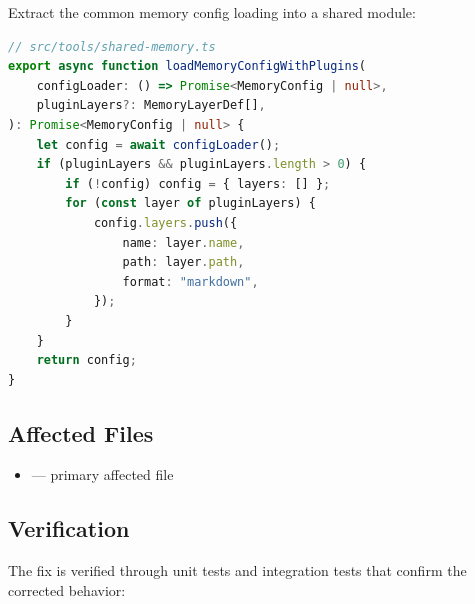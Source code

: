 Extract the common memory config loading into a shared module:



\begin{lstlisting}[language=TypeScript]
// src/tools/shared-memory.ts
export async function loadMemoryConfigWithPlugins(
    configLoader: () => Promise<MemoryConfig | null>,
    pluginLayers?: MemoryLayerDef[],
): Promise<MemoryConfig | null> {
    let config = await configLoader();
    if (pluginLayers && pluginLayers.length > 0) {
        if (!config) config = { layers: [] };
        for (const layer of pluginLayers) {
            config.layers.push({
                name: layer.name,
                path: layer.path,
                format: "markdown",
            });
        }
    }
    return config;
}

\end{lstlisting}




\subsection*{Affected Files}
\begin{itemize}
    \item {} — primary affected file
\end{itemize}

\subsection*{Verification}
The fix is verified through unit tests and integration tests that confirm the corrected behavior:

